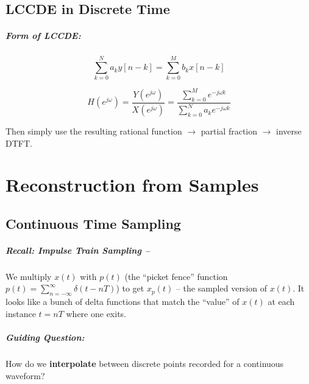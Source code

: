 \documentclass[a4paper,12pt]{report}
\begin{document}
\section{LCCDE in Discrete Time}

\paragraph{Form of LCCDE: } 
\begin{equation}
\sum_{k = 0}^{N} a_k y[n-k] = \sum_{k=0}^{M} b_k x[n-k]
\end{equation}

\begin{equation}
H(e^{j\omega}) = \frac{Y(e^{j\omega})}{X(e^{j\omega})} = \frac{\sum_{k=0}^{M} e^{-j\omega k}}{\sum_{k=0}^{N} a_k e^{-j\omega k}}
\end{equation}

Then simply use the resulting rational function $\to$ partial fraction $\to$ inverse DTFT. 


\chapter{Reconstruction from Samples}


\section{Continuous Time Sampling}

\paragraph{Recall: Impulse Train Sampling -- } We multiply $x(t)$ with $p(t)$ (the ``picket fence'' function $p(t) = \sum_{n=-\infty}^{\infty} \delta(t-nT)$) to get $x_p(t)$ -- the sampled version of $x(t)$. It looks like a bunch of delta functions that match the ``value'' of $x(t)$ at each instance $t = nT$ where one exits. 

\paragraph{Guiding Question: } How do we \textbf{interpolate} between discrete points recorded for a continuous waveform? 
\end{document}
